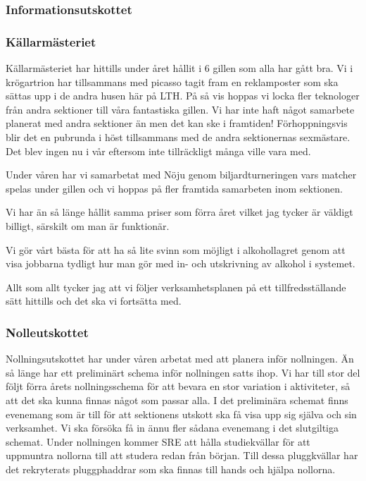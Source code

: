 \documentclass[../_main/handlingar.tex]{subfiles}
\begin{document}
\subsubsection*{Informationsutskottet}

\subsubsection*{Källarmästeriet}
Källarmästeriet har hittills under året hållit i 6 gillen som alla har gått bra. Vi i krögartrion har tillsammans med picasso tagit fram en reklamposter som ska sättas upp i de andra husen här på LTH. På så vis hoppas vi locka fler teknologer från andra sektioner till våra fantastiska gillen.
Vi har inte haft något samarbete planerat med andra sektioner än men det kan ske i framtiden! Förhoppningsvis blir det en pubrunda i höst tillsammans med de andra sektionernas sexmästare. Det blev ingen nu i vår eftersom inte tillräckligt många ville vara med. 

Under våren har vi samarbetat med Nöju genom biljardturneringen vars matcher spelas under gillen och vi hoppas på fler framtida samarbeten inom sektionen.
 
Vi har än så länge hållit samma priser som förra året vilket jag tycker är väldigt billigt, särskilt om man är funktionär.
 
Vi gör vårt bästa för att ha så lite svinn som möjligt i alkohollagret genom att visa jobbarna tydligt hur man gör med in- och utskrivning av alkohol i systemet.


Allt som allt tycker jag att vi följer verksamhetsplanen på ett tillfredsställande sätt hittills och det ska vi fortsätta med.

\newpage
\subsubsection*{Nolleutskottet}
Nollningsutskottet har under våren arbetat med att planera inför nollningen. Än så länge har ett preliminärt schema inför nollningen satts ihop. Vi har till stor del följt förra årets nollningsschema för att bevara en stor variation i aktiviteter, så att det ska kunna finnas något som passar alla. I det preliminära schemat finns evenemang som är till för att sektionens utskott ska få visa upp sig själva och sin verksamhet. Vi ska försöka få in ännu fler sådana evenemang i det slutgiltiga schemat. Under nollningen kommer SRE att hålla studiekvällar för att uppmuntra nollorna till att studera redan från början. Till dessa pluggkvällar har det rekryterats pluggphaddrar som ska finnas till hands och hjälpa nollorna. 
\end{document}
